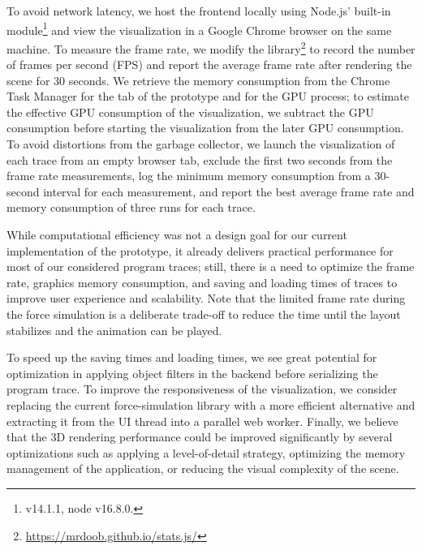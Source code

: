 To avoid network latency, we host the \tfd{} frontend locally using Node.js' built-in  module\footnote{ v14.1.1, node v16.8.0.} and view the visualization in a Google Chrome browser on the same machine.
To measure the frame rate, we modify the  library\footnote{\url{https://mrdoob.github.io/stats.js/}} to record the number of frames per second (FPS) and report the average frame rate after rendering the scene for 30 seconds.
We retrieve the memory consumption from the Chrome Task Manager for the tab of the \tfd{} prototype and for the GPU process; to estimate the effective GPU consumption of the visualization, we subtract the GPU consumption before starting the visualization from the later GPU consumption.
To avoid distortions from the garbage collector, we launch the visualization of each trace from an empty browser tab, exclude the first two seconds from the frame rate measurements, log the minimum memory consumption from a 30-second interval for each measurement, and report the best average frame rate and memory consumption of three runs for each trace.

While computational efficiency was not a design goal for our current implementation of the \tfd{} prototype, it already delivers practical performance for most of our considered program traces; still, there is a need to optimize the frame rate, graphics memory consumption, and saving and loading times of traces to improve user experience and scalability.
Note that the limited frame rate during the force simulation is a deliberate trade-off to reduce the time until the layout stabilizes and the animation can be played.

To speed up the saving times and loading times, we see great potential for optimization in applying object filters in the backend before serializing the program trace.
To improve the responsiveness of the visualization, we consider replacing the current force-simulation library  with a more efficient alternative and extracting it from the UI thread into a parallel web worker.
Finally, we believe that the 3D rendering performance could be improved significantly by several optimizations such as applying a level-of-detail strategy, optimizing the memory management of the application, or reducing the visual complexity of the scene.
